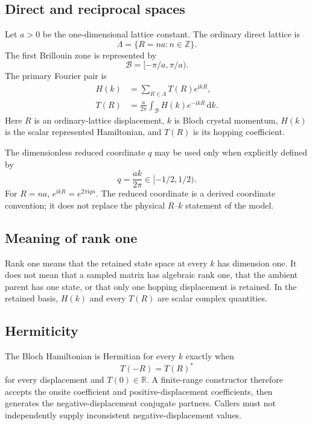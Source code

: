 \documentclass[11pt]{article}
\newcommand{\BZ}{\mathcal{B}}
\newcommand{\ii}{\mathrm{i}}
\begin{document}
\subsection{Direct and reciprocal spaces}

Let $a>0$ be the one-dimensional lattice constant.  The ordinary direct lattice is
\begin{equation}
  \Lambda=\{R=na:n\in\mathbb Z\}.
\end{equation}
The first Brillouin zone is represented by
\begin{equation}
  \BZ=[-\pi/a,\pi/a).
\end{equation}
The primary Fourier pair is
\begin{align}
  H(k) &= \sum_{R\in\Lambda} T(R)e^{\ii kR},
  \label{eq:forward-bloch}\\
  T(R) &= \frac{a}{2\pi}\int_{\BZ}H(k)e^{-\ii kR}\,\mathrm{d}k.
  \label{eq:inverse-hopping}
\end{align}
Here $R$ is an ordinary-lattice displacement, $k$ is Bloch crystal momentum, $H(k)$ is
the scalar represented Hamiltonian, and $T(R)$ is its hopping coefficient.

The dimensionless reduced coordinate $q$ may be used only when explicitly defined by
\begin{equation}
  q=\frac{ak}{2\pi}\in[-1/2,1/2).
\end{equation}
For $R=na$, $e^{\ii kR}=e^{2\pi\ii qn}$.  The reduced coordinate is a derived
coordinate convention; it does not replace the physical $R$--$k$ statement of the
model.

\subsection{Meaning of rank one}

Rank one means that the retained state space at every $k$ has dimension one.  It does
not mean that a sampled matrix has algebraic rank one, that the ambient parent has one
state, or that only one hopping displacement is retained.  In the retained basis,
$H(k)$ and every $T(R)$ are scalar complex quantities.

\subsection{Hermiticity}

The Bloch Hamiltonian is Hermitian for every $k$ exactly when
\begin{equation}
  T(-R)=T(R)^{*}
  \label{eq:scalar-hermiticity}
\end{equation}
for every displacement and $T(0)\in\mathbb R$.  A finite-range constructor therefore
accepts the onsite coefficient and positive-displacement coefficients, then generates
the negative-displacement conjugate partners.  Callers must not independently supply
inconsistent negative-displacement values.
\end{document}
